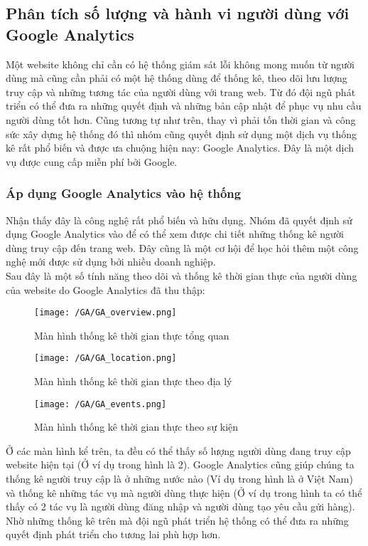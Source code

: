 			 	\subsection{Phân tích số lượng và hành vi người dùng với Google Analytics}
			 	Một website không chỉ cần có hệ thống giám sát lỗi không mong muốn từ người dùng mà cũng cần phải có một hệ thống dùng để thống kê, theo dõi lưu lượng truy cập và những tương tác của người dùng với trang web. Từ đó đội ngũ phát triển có thể đưa ra những quyết định và những bản cập nhật để phục vụ nhu cầu người dùng tốt hơn. Cũng tương tự như trên, thay vì phải tốn thời gian và công sức xây dựng hệ thống đó thì nhóm cũng quyết định sử dụng một dịch vụ thống kê rất phổ biến và được ưa chuộng hiện nay: Google Analytics. Đây là một dịch vụ được cung cấp miễn phí bởi Google.
			 	
			 	\subsubsection{Áp dụng Google Analytics vào hệ thống}
			 	Nhận thấy đây là công nghệ rất phổ biến và hữu dụng. Nhóm đã quyết định sử dụng Google Analytics vào để có thể xem được chi tiết những thống kê người dùng truy cập đến trang web. Đây cũng là một cơ hội để học hỏi thêm một công nghệ mới được sử dụng bởi nhiều doanh nghiệp.\\
			 	
			 	Sau đây là một số tính năng theo dõi và thống kê thời gian thực của người dùng của website do Google Analytics đã thu thập:
			 	
			 	\begin{figure}[H]
			 		\texttt{[image: /GA/GA\_overview.png]}
			 		\centering
			 		\caption{Màn hình thống kê thời gian thực tổng quan}
			 	\end{figure}
			 	
			 	\begin{figure}[H]
			 		\texttt{[image: /GA/GA\_location.png]}
			 		\centering
			 		\caption{Màn hình thống kê thời gian thực theo địa lý}
			 	\end{figure}
			 	
			 	\begin{figure}[H]
			 		\texttt{[image: /GA/GA\_events.png]}
			 		\centering
			 		\caption{Màn hình thống kê thời gian thực theo sự kiện}
			 	\end{figure}
			 	
			 	Ở các màn hình kể trên, ta đều có thể thấy số lượng người dùng đang truy cập website hiện tại (Ở ví dụ trong hình là 2). Google Analytics cũng giúp chúng ta thống kê người truy cập là ở những nước nào (Ví dụ trong hình là ở Việt Nam) và thống kê những tác vụ mà người dùng thực hiện (Ở ví dụ trong hình ta có thể thấy có 2 tác vụ là người dùng đăng nhập và người dùng tạo yêu cầu gửi hàng). Nhờ những thống kê trên mà đội ngũ phát triển hệ thống có thể đưa ra những quyết định phát triển cho tương lai phù hợp hơn.
			 	
